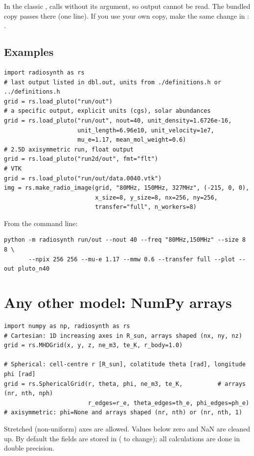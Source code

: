 \begin{note}
In the classic ,  calls 
without its  argument, so  output cannot be read.
The bundled copy passes  there (one line). If you use your own copy,
make the same change in :
.
\end{note}

\subsection*{Examples}
\begin{lstlisting}[style=pyex]
import radiosynth as rs
# last output listed in dbl.out, units from ./definitions.h or ../definitions.h
grid = rs.load_pluto("run/out")
# a specific output, explicit units (cgs), solar abundances
grid = rs.load_pluto("run/out", nout=40, unit_density=1.6726e-16,
                     unit_length=6.96e10, unit_velocity=1e7,
                     mu_e=1.17, mean_mol_weight=0.6)
# 2.5D axisymmetric run, float output
grid = rs.load_pluto("run2d/out", fmt="flt")
# VTK
grid = rs.load_pluto("run/out/data.0040.vtk")
img = rs.make_radio_image(grid, "80MHz, 150MHz, 327MHz", (-215, 0, 0),
                          x_size=8, y_size=8, nx=256, ny=256,
                          transfer="full", n_workers=8)
\end{lstlisting}
From the command line:
\begin{lstlisting}
python -m radiosynth run/out --nout 40 --freq "80MHz,150MHz" --size 8 8 \
       --npix 256 256 --mu-e 1.17 --mmw 0.6 --transfer full --plot --out pluto_n40
\end{lstlisting}

\section{Any other model: NumPy arrays}\label{sec:numpy}
\begin{lstlisting}[style=pyex]
import numpy as np, radiosynth as rs
# Cartesian: 1D increasing axes in R_sun, arrays shaped (nx, ny, nz)
grid = rs.MHDGrid(x, y, z, ne_m3, te_K, r_body=1.0)

# Spherical: cell-centre r [R_sun], colatitude theta [rad], longitude phi [rad]
grid = rs.SphericalGrid(r, theta, phi, ne_m3, te_K,          # arrays (nr, nth, nph)
                        r_edges=r_e, theta_edges=th_e, phi_edges=ph_e)
# axisymmetric: phi=None and arrays shaped (nr, nth) or (nr, nth, 1)
\end{lstlisting}
Stretched (non-uniform) axes are allowed. Values below zero and NaN are cleaned up.
By default the fields are stored in \code{float32} (\code{dtype=np.float64} to change);
all calculations are done in double precision.

